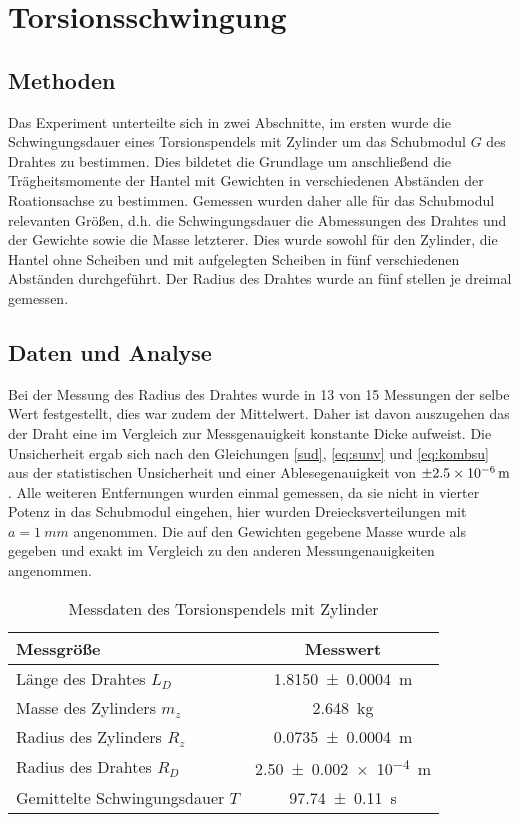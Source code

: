 
\section{Torsionsschwingung}


\subsection{Methoden}
Das Experiment unterteilte sich in zwei Abschnitte, im ersten wurde die Schwingungsdauer eines Torsionspendels mit Zylinder um das Schubmodul $G$ des Drahtes zu bestimmen. Dies bildetet die Grundlage um anschließend die Trägheitsmomente der Hantel mit Gewichten in verschiedenen Abständen der Roationsachse zu bestimmen.
Gemessen wurden daher alle für das Schubmodul relevanten Größen, d.h. die Schwingungsdauer die Abmessungen des Drahtes und der Gewichte sowie die Masse letzterer. Dies wurde sowohl für den Zylinder, die Hantel ohne Scheiben und mit aufgelegten Scheiben in fünf verschiedenen Abständen durchgeführt. Der Radius des Drahtes wurde an fünf stellen je dreimal gemessen.


\subsection{Daten und Analyse}
 Bei der Messung des Radius des Drahtes wurde in 13 von 15 Messungen der selbe Wert festgestellt, dies war zudem der Mittelwert. Daher ist davon auszugehen das der Draht eine im Vergleich zur Messgenauigkeit konstante Dicke aufweist. Die Unsicherheit ergab sich nach den Gleichungen \ref{sud}, \ref{eq:sunv} und \ref{eq:kombsu} aus der statistischen Unsicherheit und einer Ablesegenauigkeit von $\SI{\pm 2.5e-6}{m}$.
 Alle weiteren Entfernungen wurden einmal gemessen, da sie nicht in vierter Potenz in das Schubmodul eingehen, hier wurden Dreiecksverteilungen mit $a=\SI{1}{mm}$ angenommen. Die auf den Gewichten gegebene Masse wurde als gegeben und exakt im Vergleich zu den anderen Messungenauigkeiten angenommen.  
 
 
 
 
\begin{table}[h]
\centering	
\caption{Messdaten des Torsionspendels mit Zylinder}
 \begin{tabular}{|l|c|}
 
 	\hline 
 Messgröße	& Messwert  \\ 
 	\hline 
 	Länge des Drahtes $L_D$& \SI{1.8150\pm 0.0004 } {m} \\ 
 	\hline 
 	Masse des Zylinders $m_z$& \SI{2.648}{kg} \\ 
 	\hline 
 	Radius des Zylinders $R_z$ & \SI{0.0735 \pm 0.0004}{m}  \\ 
 	\hline 
 	Radius des Drahtes $R_D$ & \SI{2.50+-0.002 e-4} {m} \\ 
 	\hline 
 	Gemittelte Schwingungsdauer $T$&\SI{97.74+-0.11}{s}  \\ 
 	\hline 
 \end{tabular} 
	\label{tab:dataTZ}
\end{table} 

